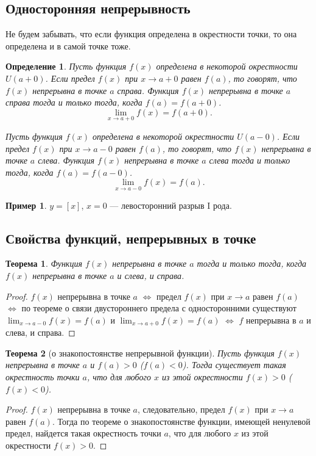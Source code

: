 \documentclass[a4paper,12pt]{article} %
\newtheorem{definition}{Определение}[section]
\newtheorem{theorem}{Теорема}[section]
\theoremstyle{remark}
\theoremstyle{definition}
\newtheorem{exmp}{Пример}[section]
\begin{document}
\subsection{Односторонняя непрерывность}
Не будем забывать, что если функция определена в окрестности точки, то она определена и в самой точке тоже.
\begin{definition}
	Пусть функция $f(x)$ определена в некоторой окрестности $U(a+0)$. Если предел $f(x)$ при $x\to a+0$ равен $f(a)$, то говорят, что $f(x)$ непрерывна в точке $a$ справа. Функция $f(x)$ непрерывна в точке $a$ справа тогда и только тогда, когда $f(a) = f(a+0)$.
     \[\lim_{x \to a+0} f(x) = f(a + 0).\] 

	Пусть функция $f(x)$ определена в некоторой окрестности $U(a-0)$. Если предел $f(x)$ при $x\to a-0$ равен $f(a)$, то говорят, что $f(x)$ непрерывна в точке $a$ слева. Функция $f(x)$ непрерывна в точке $a$ слева тогда и только тогда, когда $f(a) = f(a-0)$.
    \[\lim_{x \to a-0} f(x) = f(a).\] 
\end{definition}
\begin{exmp}
    $y = [x]$, $x = 0$ --- левосторонний разрыв I рода.
\end{exmp}

\subsection{Свойства функций, непрерывных в точке}
\begin{theorem}
	Функция $f(x)$ непрерывна в точке $a$ тогда и только тогда, когда $f(x)$ непрерывна в точке $a$ и слева, и справа.
\end{theorem}
\begin{proof}
	$f(x)$ непрерывна в точке $a$ $\iff$ предел $f(x)$ при $x\to a$ равен $f(a)$ $\iff$ по теореме о связи двустороннего предела с односторонними существуют $\lim_{x \to a-0} f(x) = f(a)$ и $\lim_{x \to a+0} f(x) = f(a)$ $\iff$ $f$ непрерывна в $a$ и слева, и справа.
\end{proof}

\begin{theorem}[о знакопостоянстве непрерывной функции]
	Пусть функция $f(x)$ непрерывна в точке $a$ и $f(a)>0$ ($f(a)<0$). Тогда существует такая окрестность точки $a$, что для любого $x$ из этой окрестности $f(x)>0$ ($f(x)<0$).
\end{theorem}
\begin{proof}
    $f(x)$ непрерывна в точке $a$, следовательно, предел $f(x)$ при $x\to a$ равен $f(a)$. Тогда по теореме о знакопостоянстве функции, имеющей ненулевой предел, найдется такая окрестность точки $a$, что для любого $x$ из этой окрестности $f(x) > 0$.
\end{proof}
\end{document}
